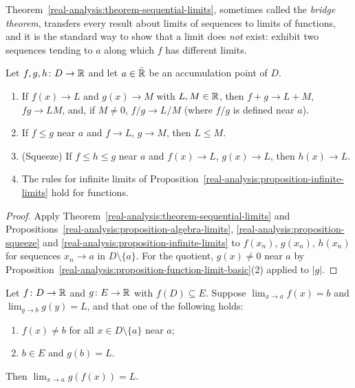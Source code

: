 Theorem~\ref{real-analysis:theorem-sequential-limits}, sometimes called the \emph{bridge theorem}, transfers every result about limits of sequences to limits of functions, and it is the standard way to
show that a limit does \emph{not} exist: exhibit two sequences tending to $a$ along which $f$ has different limits.

\begin{corollary}\label{real-analysis:corollary-limit-rules}
Let $f, g, h \colon D \to \mathbb{R}$ and let $a \in \bar{\mathbb{R}}$ be an accumulation point of $D$.
\begin{enumerate}
\item If $f(x) \to L$ and $g(x) \to M$ with $L, M \in \mathbb{R}$, then $f + g \to L + M$, $fg \to LM$, and, if $M \neq 0$, $f/g \to L/M$ (where $f/g$ is defined near $a$).
\item If $f \leq g$ near $a$ and $f \to L$, $g \to M$, then $L \leq M$.
\item (Squeeze) If $f \leq h \leq g$ near $a$ and $f(x) \to L$, $g(x) \to L$, then $h(x) \to L$.
\item The rules for infinite limits of Proposition~\ref{real-analysis:proposition-infinite-limits} hold for functions.
\end{enumerate}
\end{corollary}

\begin{proof}
Apply Theorem~\ref{real-analysis:theorem-sequential-limits} and Propositions~\ref{real-analysis:proposition-algebra-limits}, \ref{real-analysis:proposition-squeeze} and
\ref{real-analysis:proposition-infinite-limits} to $f(x_n)$, $g(x_n)$, $h(x_n)$ for sequences $x_n \to a$ in $D \setminus \{a\}$. For the quotient, $g(x) \neq 0$ near $a$ by
Proposition~\ref{real-analysis:proposition-function-limit-basic}(2) applied to $|g|$.
\end{proof}

\begin{proposition}\label{real-analysis:proposition-composite-limit}
Let $f \colon D \to \mathbb{R}$ and $g \colon E \to \mathbb{R}$ with $f(D) \subseteq E$. Suppose $\lim_{x \to a}f(x) = b$ and $\lim_{y \to b}g(y) = L$, and that one of the following holds:
\begin{enumerate}
\item $f(x) \neq b$ for all $x \in D \setminus \{a\}$ near $a$;
\item $b \in E$ and $g(b) = L$.
\end{enumerate}
Then $\lim_{x \to a}g(f(x)) = L$.
\end{proposition}


